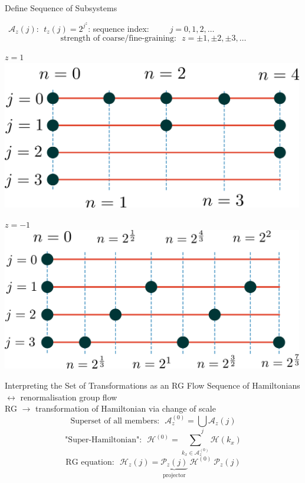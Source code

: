 \documentclass[12pt,aspectratio=169]{beamer}
\begin{document}
\begin{frame}{Define Sequence of Subsystems}

\(~ ~ \mathcal{A}_{z}(j): ~ ~ t_z(j) = 2^{j^z}\): sequence index:~ ~ ~ \(j = 0,1,2,\ldots\)
\[\text{strength of coarse/fine-graining:}~ ~ ~ z = \pm 1,\pm 2,\pm 3,\ldots\]
\begin{minipage}{0.48\textwidth}
\centering
\( z = 1\)\\
\includegraphics[width=0.99\textwidth]{./figures/coarse-graining.pdf}
\end{minipage}
\hspace*{\fill}
\begin{minipage}{0.49\textwidth}
\centering
\( z = -1\)\\
\includegraphics[width=0.99\textwidth]{./figures/fine-graining.pdf}
\end{minipage}
\end{frame}

\begin{frame}{Interpreting the Set of Transformations as an RG Flow}
	Sequence of Hamiltonians \(\leftrightarrow\) \alert{renormalisation} group flow\\[10pt]
	RG \(\rightarrow\) transformation of Hamiltonian via change of scale\\
	\[\text{Superset of all members:}~ ~ ~ \mathcal{A}_z^{(0)} = \bigcup_j \mathcal{A}_z(j)\]
	\[\text{"Super-Hamiltonian":}~ ~ ~\mathcal{H}^{(0)} = \sum_{k_x \in \mathcal{A}_z^{(0)}} \mathcal{H}\left( k_x \right)\]
	\[\text{RG equation:}~ ~ ~\mathcal{H}_z(j) = \underbrace{\mathcal{P}_z(j)}_\text{projector} ~ \mathcal{H}^{(0)} ~ \mathcal{P}_z(j)\]
\end{frame}
\end{document}
